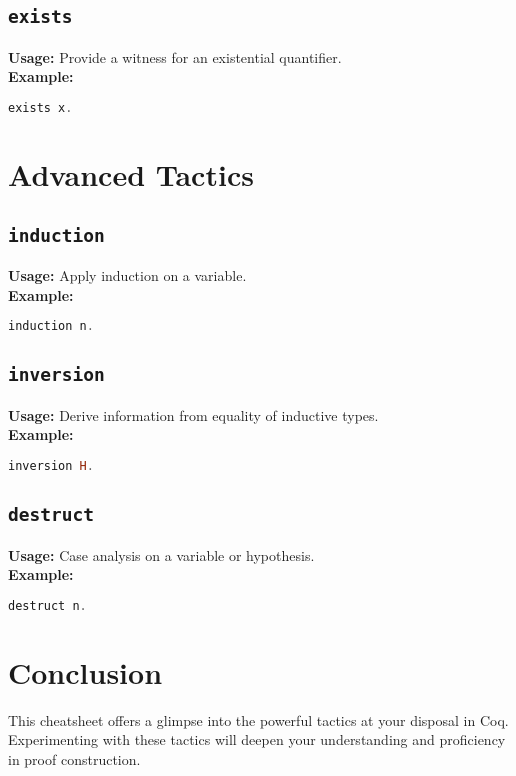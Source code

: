 \documentclass{article}
\begin{document}
\subsection{\texttt{exists}}
\textbf{Usage:} Provide a witness for an existential quantifier. \\
\textbf{Example:}
\begin{lstlisting}[language=haskell]
exists x.
\end{lstlisting}

\section{Advanced Tactics}
\subsection{\texttt{induction}}
\textbf{Usage:} Apply induction on a variable. \\
\textbf{Example:}
\begin{lstlisting}[language=haskell]
induction n.
\end{lstlisting}

\subsection{\texttt{inversion}}
\textbf{Usage:} Derive information from equality of inductive types. \\
\textbf{Example:}
\begin{lstlisting}[language=haskell]
inversion H.
\end{lstlisting}

\subsection{\texttt{destruct}}
\textbf{Usage:} Case analysis on a variable or hypothesis. \\
\textbf{Example:}
\begin{lstlisting}[language=haskell]
destruct n.
\end{lstlisting}

\section{Conclusion}
This cheatsheet offers a glimpse into the powerful tactics at your disposal in Coq. Experimenting with these tactics will deepen your understanding and proficiency in proof construction.
\end{document}
